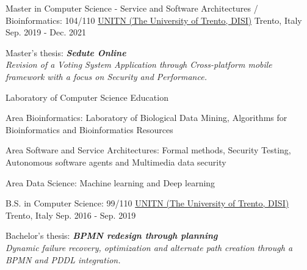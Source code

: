

\begin{cventries}


  \cventry
    {Master in Computer Science - Service and Software Architectures / Bioinformatics: 104/110} %
    {\href{https://www.unitn.it/}{UNITN (The University of Trento, DISI)}}  %
    {Trento, Italy} %
    {Sep. 2019 - Dec. 2021} %
    {
      \begin{cvitems} %
        \item {Master's thesis: \textbf{\textit{Sedute Online}}\\\textit{Revision of a Voting System Application through Cross-platform mobile framework with a focus on Security and Performance.}}
        \item {Laboratory of Computer Science Education}
        \item {Area Bioinformatics: Laboratory of Biological Data Mining, Algorithms for Bioinformatics and Bioinformatics Resources}
        \item {Area Software and Service Architectures: Formal methods, Security Testing, Autonomous software agents and Multimedia data security}
        \item {Area Data Science: Machine learning and Deep learning}
      \end{cvitems}
    }

  \cventry
    {B.S. in Computer Science: 99/110} %
    {\href{https://www.unitn.it/}{UNITN (The University of Trento, DISI)}}  %
    {Trento, Italy} %
    {Sep. 2016 - Sep. 2019} %
    {
      \begin{cvitems} %
        \item {Bachelor's thesis: \textbf{\textit{BPMN redesign through planning}} \\\textit{Dynamic failure recovery, optimization and alternate path creation through a BPMN and PDDL integration.}}
      \end{cvitems}
    }


\end{cventries}
